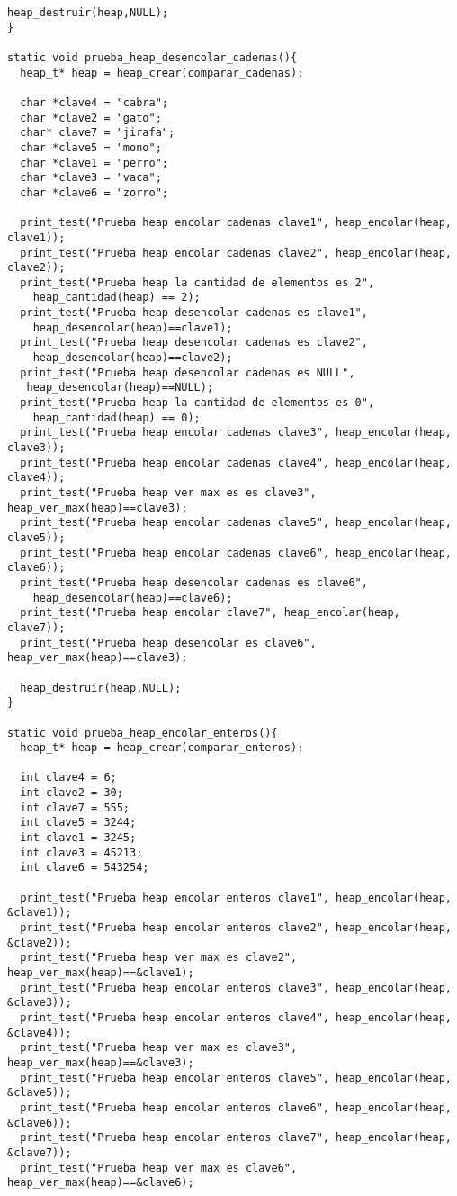 \documentclass[11pt,a4paper]{article}
\begin{document}
\begin{lstlisting}[style= c]
  heap_destruir(heap,NULL);
}

static void prueba_heap_desencolar_cadenas(){
  heap_t* heap = heap_crear(comparar_cadenas);

  char *clave4 = "cabra";
  char *clave2 = "gato";
  char* clave7 = "jirafa";
  char *clave5 = "mono";
  char *clave1 = "perro";
  char *clave3 = "vaca";
  char *clave6 = "zorro";
  
  print_test("Prueba heap encolar cadenas clave1", heap_encolar(heap, clave1));
  print_test("Prueba heap encolar cadenas clave2", heap_encolar(heap, clave2));
  print_test("Prueba heap la cantidad de elementos es 2", 
    heap_cantidad(heap) == 2);
  print_test("Prueba heap desencolar cadenas es clave1", 
    heap_desencolar(heap)==clave1);
  print_test("Prueba heap desencolar cadenas es clave2", 
    heap_desencolar(heap)==clave2);
  print_test("Prueba heap desencolar cadenas es NULL",
   heap_desencolar(heap)==NULL);
  print_test("Prueba heap la cantidad de elementos es 0", 
    heap_cantidad(heap) == 0);
  print_test("Prueba heap encolar cadenas clave3", heap_encolar(heap, clave3));
  print_test("Prueba heap encolar cadenas clave4", heap_encolar(heap, clave4));
  print_test("Prueba heap ver max es es clave3", heap_ver_max(heap)==clave3);
  print_test("Prueba heap encolar cadenas clave5", heap_encolar(heap, clave5));
  print_test("Prueba heap encolar cadenas clave6", heap_encolar(heap, clave6));
  print_test("Prueba heap desencolar cadenas es clave6", 
    heap_desencolar(heap)==clave6);
  print_test("Prueba heap encolar clave7", heap_encolar(heap, clave7));
  print_test("Prueba heap desencolar es clave6", heap_ver_max(heap)==clave3);

  heap_destruir(heap,NULL);
}

static void prueba_heap_encolar_enteros(){
  heap_t* heap = heap_crear(comparar_enteros);

  int clave4 = 6;
  int clave2 = 30;
  int clave7 = 555;
  int clave5 = 3244;
  int clave1 = 3245;
  int clave3 = 45213;
  int clave6 = 543254;
  
  print_test("Prueba heap encolar enteros clave1", heap_encolar(heap, &clave1));
  print_test("Prueba heap encolar enteros clave2", heap_encolar(heap, &clave2));
  print_test("Prueba heap ver max es clave2", heap_ver_max(heap)==&clave1);
  print_test("Prueba heap encolar enteros clave3", heap_encolar(heap, &clave3));
  print_test("Prueba heap encolar enteros clave4", heap_encolar(heap, &clave4));
  print_test("Prueba heap ver max es clave3", heap_ver_max(heap)==&clave3);
  print_test("Prueba heap encolar enteros clave5", heap_encolar(heap, &clave5));
  print_test("Prueba heap encolar enteros clave6", heap_encolar(heap, &clave6));
  print_test("Prueba heap encolar enteros clave7", heap_encolar(heap, &clave7));
  print_test("Prueba heap ver max es clave6", heap_ver_max(heap)==&clave6);


\end{lstlisting}
\end{document}
